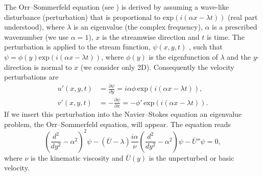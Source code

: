 The Orr--Sommerfeld equation (see \citet{Orzag1971}) is derived by
assuming a wave-like disturbance (perturbation) that is proportional
to $\text{exp}(i(\alpha x-\lambda t))$ (real part understood), where
$\lambda$ is an eigenvalue (the complex frequency), $\alpha$ is a
prescribed wavenumber (we use $\alpha=1$), $x$ is the streamwise
direction and $t$ is time. The perturbation is applied to the stream
function, $\psi(x,y,t)$ , such that $\psi=\phi(y) \text{exp}(i(\alpha
x- \lambda t))$, where $\phi(y)$ is the eigenfunction of $\lambda$ and
the $y$-direction is normal to $x$ (we consider only 2D). Consequently
the velocity perturbations are
\begin{align}
 u'(x,y,t)&=\frac{\partial \psi}{\partial y}=i\alpha \phi \, \text{exp}(i(\alpha x- \lambda t)),
\\
 v'(x,y,t)&=-\frac{\partial \psi}{\partial x}=-\phi' \, \text{exp}(i(\alpha x- \lambda t)).
\end{align}
If we insert this perturbation into the Navier--Stokes equation an
eigenvalue problem, the Orr--Sommerfeld equation, will appear. The
equation reads
\begin{equation}
 \left( \frac{d^2}{dy^2}-\alpha^2\right)^2\psi
      - \left(\overline{U}-\lambda \right) \frac{i \alpha}{\nu}
          \left( \frac{d^2}{dy^2}-\alpha^2\right)\psi - \overline{U}''\psi=0,
 \label{eq:mortensen:OrrS}
\end{equation}
where $\nu$ is the kinematic viscosity and $\overline{U}(y)$ is the
unperturbed or basic velocity.

